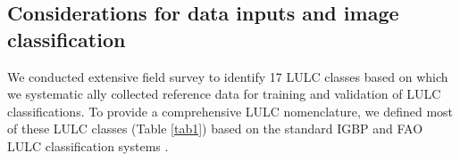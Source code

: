 \documentclass[12pt,oneside,preprint,3p,authoryear,times]{elsarticle} %
\begin{document}
\hypertarget{considerations-for-data-inputs-and-image-classification}{%
\subsection{Considerations for data inputs and image
classification}\label{considerations-for-data-inputs-and-image-classification}}

We conducted extensive field survey to identify 17 LULC classes based on
which we systematic ally collected reference data for training and
validation of LULC classifications. To provide a comprehensive LULC
nomenclature, we defined most of these LULC classes (Table \ref{tab1})
based on the standard IGBP and FAO LULC classification systems
\citep{Di-Gregorio-et-al-2016, FRA-2000}.

\begin{table}[H]


\end{table}
\end{document}
